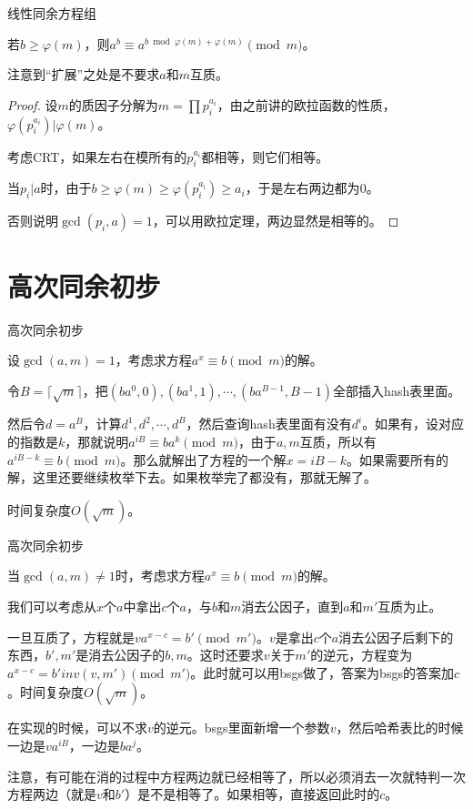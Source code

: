 \documentclass{ctexbeamer}        %
\begin{document}
\begin{frame}{线性同余方程组}
\begin{theorem}[扩展欧拉定理]
    若$b\ge \varphi(m)$，则$a^b\equiv a^{b \bmod \varphi(m)+\varphi(m)} \pmod m$。
\end{theorem}
注意到``扩展''之处是不要求$a$和$m$互质。
\begin{proof}
    设$m$的质因子分解为$m=\prod p_i^{a_i}$，由之前讲的欧拉函数的性质，$\varphi(p_i^{a_i})|\varphi(m)$。

    考虑CRT，如果左右在模所有的$p_i^{a_i}$都相等，则它们相等。

    当$p_i|a$时，由于$b \ge \varphi(m)\ge \varphi(p_i^{a_i}) \ge a_i$，于是左右两边都为$0$。

    否则说明$\gcd(p_i,a)=1$，可以用欧拉定理，两边显然是相等的。
\end{proof}
\end{frame}

\section{高次同余初步}

\begin{frame}{高次同余初步}
\begin{example}[bsgs]
    设$\gcd(a,m)=1$，考虑求方程$a^x\equiv b \pmod m$的解。
\end{example}
令$B=\lceil \sqrt{m} \rceil$，把$(ba^0,0),(ba^1,1),\cdots,(ba^{B-1},B-1)$全部插入hash表里面。

然后令$d=a^B$，计算$d^1,d^2,\cdots,d^B$，然后查询hash表里面有没有$d^i$。如果有，设对应的指数是$k$，那就说明$a^{iB}\equiv ba^k \pmod m$，由于$a,m$互质，所以有$a^{iB-k} \equiv b \pmod m$。那么就解出了方程的一个解$x=iB-k$。如果需要所有的解，这里还要继续枚举下去。如果枚举完了都没有，那就无解了。

时间复杂度$O(\sqrt{m})$。
\end{frame}

\begin{frame}{高次同余初步}
\begin{example}[exbsgs]
    当$\gcd(a,m)\neq 1$时，考虑求方程$a^x\equiv b \pmod m$的解。
\end{example}
我们可以考虑从$x$个$a$中拿出$c$个$a$，与$b$和$m$消去公因子，直到$a$和$m'$互质为止。

一旦互质了，方程就是$va^{x-c}=b' \pmod{m'}$。$v$是拿出$c$个$a$消去公因子后剩下的东西，$b',m'$是消去公因子的$b,m$。这时还要求$v$关于$m'$的逆元，方程变为$a^{x-c}=b'inv(v,m')\pmod{m'}$。此时就可以用bsgs做了，答案为bsgs的答案加$c$。时间复杂度$O(\sqrt{m})$。

在实现的时候，可以不求$v$的逆元。bsgs里面新增一个参数$v$，然后哈希表比的时候一边是$va^{iB}$，一边是$ba^j$。

注意，有可能在消的过程中方程两边就已经相等了，所以必须消去一次就特判一次方程两边（就是$v$和$b'$）是不是相等了。如果相等，直接返回此时的$c$。
\end{frame}
\end{document}

